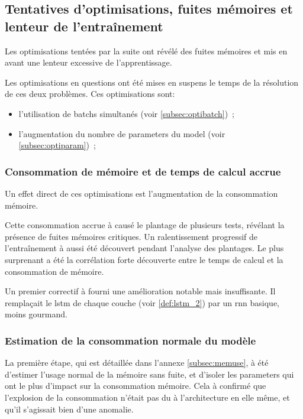 \subsection{Tentatives d'optimisations, fuites mémoires et lenteur de l'entraînement}\label{subsec:optimem}

Les optimisations tentées par la suite ont révélé des fuites mémoires et mis en avant une lenteur excessive de l'apprentissage.

Les optimisations en questions ont été mises en suspens le temps de la résolution de ces deux problèmes.
Ces optimisations sont:
\begin{itemize}
	\item l'utilisation de \glspl{batch} simultanés (voir \autoref{subsec:optibatch})~; 
	\item l'augmentation du nombre de \glspl{parameter} du \gls{model} (voir \autoref{subsec:optiparam})~;
\end{itemize}

\subsubsection{Consommation de mémoire et de temps de calcul accrue}
Un effet direct de ces optimisations est l'augmentation de la consommation mémoire.

Cette consommation accrue à causé le plantage de plusieurs tests, révélant la présence de fuites mémoires critiques.
Un ralentissement progressif de l'entraînement à aussi été découvert pendant l'analyse des plantages. %
Le plus surprenant a été la corrélation forte découverte entre le temps de calcul et la consommation de mémoire.

Un premier correctif à fourni une amélioration notable mais insuffisante.
Il remplaçait le \gls{lstm} de chaque couche (voir \autoref{def:lstm_2}) par un \gls{rnn} basique, moins gourmand. %

\subsubsection{Estimation de la consommation normale du modèle}
La première étape, qui est détaillée dans l'annexe \ref{subsec:memuse}, à été d'estimer l'usage normal de la mémoire sans fuite, et d'isoler les \glspl{parameter} qui ont le plus d'impact sur la consommation mémoire.
Cela à confirmé que l'explosion de la consommation n'était pas du à l'architecture en elle même, et qu'il s'agissait bien d'une anomalie.

